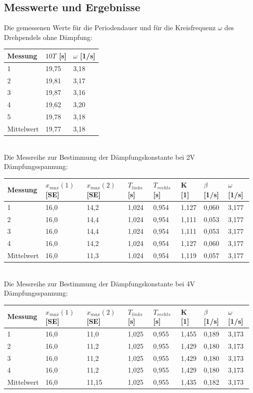\documentclass{scrartcl}
\begin{document}
\subsection{Messwerte und Ergebnisse}
Die gemessenen Werte für die Periodendauer und für die Kreisfrequenz $\omega$ des Drehpendels ohne Dämpfung:
\begin{table}[h]
\begin{tabular}{l|l|l}
Messung    & $10 T$ {[}s{]} & $\omega$ {[}1/s{]}\\
\hline
1          & 19,75               & 3,18                  \\
2          & 19,81               & 3,17                  \\
3          & 19,87               & 3,16                  \\
4          & 19,62               & 3,20                  \\
5          & 19,78               & 3,18                  \\
Mittelwert & 19,77               & 3,18                 
\end{tabular}
\end{table}
\\
Die Messreihe zur Bestimmung der Dämpfungskonstante bei 2V Dämpfungsspannung:
\begin{table}[h]
\begin{tabular}{l|l|l|l|l|l|l|l}
Messung    & $x_{max}(1)$ [SE]      & $x_{max}(2)$ [SE]      & $T_{links}$ [s]      &      $T_{rechts}$ [s] & K [1]       & $\beta$ [1/s]     & $\omega$ [1/s]      \\
\hline
1          & 16,0 & 14,2  & 1,024 & 0,954 & 1,127 & 0,060 & 3,177 \\
2          & 16,0 & 14,4  & 1,024 & 0,954 & 1,111 & 0,053 & 3,177 \\
3          & 16,0 & 14,4  & 1,024 & 0,954 & 1,111 & 0,053 & 3,177 \\
4          & 16,0 & 14,2  & 1,024 & 0,954 & 1,127 & 0,060 & 3,177 \\
Mittelwert & 16,0 & 11,3  & 1,024 & 0,954 & 1,119 & 0,057 & 3,177
\end{tabular}
\end{table}
\\
Die Messreihe zur Bestimmung der Dämpfungskonstante bei 4V Dämpfungsspannung:
\begin{table}[h]
\begin{tabular}{l|l|l|l|l|l|l|l}
Messung    & $x_{max}(1)$ [SE]      & $x_{max}(2)$ [SE]      & $T_{links}$ [s]      &      $T_{rechts}$ [s] & K [1]       & $\beta$ [1/s]     & $\omega$ [1/s]      \\
\hline
1          & 16,0 & 11,0  & 1,025 & 0,955 & 1,455 & 0,189 & 3,173 \\
2          & 16,0 & 11,2  & 1,025 & 0,955 & 1,429 & 0,180 & 3,173 \\
3          & 16,0 & 11,2  & 1,025 & 0,955 & 1,429 & 0,180 & 3,173 \\
4          & 16,0 & 11,2  & 1,025 & 0,955 & 1,429 & 0,180 & 3,173 \\
Mittelwert & 16,0 & 11,15 & 1,025 & 0,955 & 1,435 & 0,182 & 3,173
\end{tabular}
\end{table}
\end{document}
